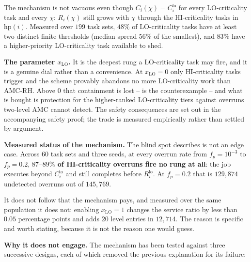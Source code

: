 \documentclass{article}
\begin{document}
The mechanism is not vacuous even though $C_i(\chi) = C_i^{\mathrm{lo}}$ for
every LO-criticality task and every $\chi$: $R_i(\chi)$ still grows with $\chi$
through the HI-criticality tasks in $\mathrm{hp}(i)$. Measured over $199$ task
sets, $48\%$ of LO-criticality tasks have at least two distinct finite
thresholds (median spread $56\%$ of the smallest), and $83\%$ have a
higher-priority LO-criticality task available to shed.

\textbf{The parameter $x_{\mathrm{LO}}$.} It is the deepest rung a
LO-criticality task may fire, and it is a genuine dial rather than a
convenience. At $x_{\mathrm{LO}} = 0$ only HI-criticality tasks trigger and the
scheme provably abandons no more LO-criticality work than AMC-RH. Above $0$
that containment is lost --  is the counterexample --
and what is bought is protection for the higher-ranked LO-criticality tiers
against overruns two-level AMC cannot detect. The safety consequences are set
out in the accompanying safety proof; the trade is measured empirically rather
than settled by argument.

\textbf{Measured status of the mechanism.} The blind spot
 describes is not an edge case. Across 60 task sets and
three seeds, at every overrun rate from $f_p = 10^{-3}$ to $f_p = 0.2$,
\textbf{$87$--$89\%$ of HI-criticality overruns fire no rung at all}: the job
executes beyond $C_i^{\mathrm{lo}}$ and still completes before
$R_i^{\mathrm{lo}}$. At $f_p = 0.2$ that is $129{,}874$ undetected overruns out
of $145{,}769$.

It does not follow that the mechanism pays, and measured over the same
population it does not: enabling $x_{\mathrm{LO}} = 1$ changes the service
ratio by less than $0.05$ percentage points and adds $20$ level entries in
$12{,}714$. The reason is specific and worth stating, because it is not the
reason one would guess.

\textbf{Why it does not engage.} The mechanism has been tested against three
successive designs, each of which removed the previous explanation for its
failure:
\end{document}
